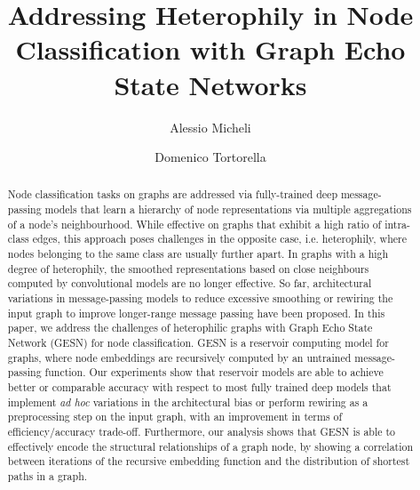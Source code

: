 \documentclass[final,5p,times,twocolumn]{elsarticle}
\begin{document}
\begin{frontmatter}





\title{Addressing Heterophily in Node Classification with Graph Echo State Networks}



\author[unipi]{Alessio Micheli}

\author[unipi]{Domenico Tortorella}



\begin{abstract}
Node classification tasks on graphs are addressed via fully-trained deep message-passing models that learn a hierarchy of node representations via multiple aggregations of a node's neighbourhood.
While effective on graphs that exhibit a high ratio of intra-class edges, this approach poses challenges in the opposite case, i.e. heterophily, where nodes belonging to the same class are usually further apart.
In graphs with a high degree of heterophily, the smoothed representations based on close neighbours computed by convolutional models are no longer effective.
So far, architectural variations in message-passing models to reduce excessive smoothing or rewiring the input graph to improve longer-range message passing have been proposed.
In this paper, we address the challenges of heterophilic graphs with Graph Echo State Network (GESN) for node classification.
GESN is a reservoir computing model for graphs, where node embeddings are recursively computed by an untrained message-passing function.
Our experiments show that reservoir models are able to achieve better or comparable accuracy with respect to most fully trained deep models that implement \emph{ad hoc} variations in the architectural bias or perform rewiring as a preprocessing step on the input graph, with an improvement in terms of efficiency/accuracy trade-off.
Furthermore, our analysis shows that GESN is able to effectively encode the structural relationships of a graph node, by showing a correlation between iterations of the recursive embedding function and the distribution of shortest paths in a graph.
\end{abstract}


\end{frontmatter}
\end{document}
